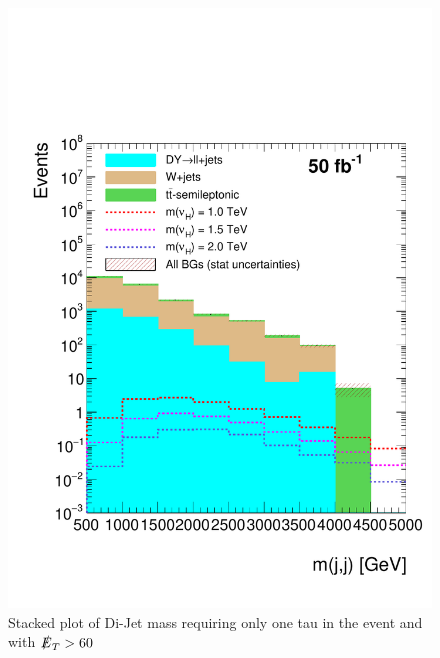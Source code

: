 \begin{figure}[htbp!]
\centering
\includegraphics[width=0.9\linewidth]{StackPlots/mjj_1Tau_met60_50ifb.pdf}
\caption{Stacked plot of Di-Jet mass requiring only one tau in the event and with $\slashed{E}_{T} > 60$}
\label{fig: mjj1tauMet60}
\end{figure}

